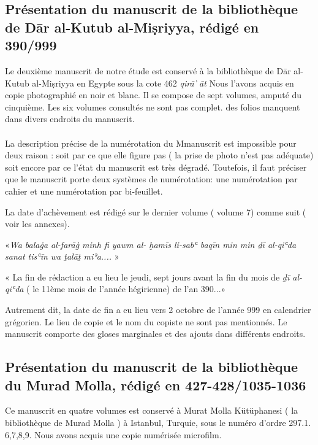 \documentclass[a4paper,12pt]{report}
\begin{document}
\begin{itemize}
\begin{enumerate}
\subsection{	Présentation du manuscrit de la bibliothèque  de Dār al-Kutub al-Miṣriyya, rédigé en 390/999}

Le deuxième manuscrit de notre étude est conservé à la bibliothèque de Dār al-Kutub al-Miṣriyya en Egypte sous la cote 462 
\textit{ qirā ͗ āt  }  Nous l'avons acquis en  copie  photographié en noir et blanc. Il se compose de sept volumes, amputé du cinquième. Les six  volumes consultés ne sont pas complet. des folios manquent  dans divers endroits du manuscrit. 

\paragraph{}
La description précise de la numérotation du Mmanuscrit est impossible pour deux raison : soit par ce que elle figure pas ( la prise de photo n'est pas adéquate)   soit encore par ce  l'état du manuscrit est très dégradé. Toutefois, il faut préciser que le manuscrit porte deux systèmes de numérotation: une numérotation par cahier et une numérotation par bi-feuillet.  

La date d'achèvement est rédigé sur le dernier volume ( volume 7) comme suit ( voir les annexes). 

«\textit{Wa balaġa al-farāġ minh fi yawm al- ḫamīs li-sabʿ baqīn min min ḏī al-qiʿda sanat tisʿīn wa ṯalāṯ miʾa....} »

« La fin de rédaction a eu lieu le jeudi, sept jours avant la fin du mois de \textit{ḏī al-qiʿda} ( le 11ème mois de l'année hégirienne)  de l'an 390...»

Autrement dit, la date de fin a eu lieu vers 2 octobre de l'année 999 en calendrier grégorien. Le lieu de copie et le nom du copiste ne sont pas mentionnés. Le manuscrit comporte des gloses marginales et des ajouts dans différents endroits.


\subsection{ Présentation du manuscrit de la bibliothèque du Murad Molla, rédigé en 427-428/1035-1036 }

Ce manuscrit en quatre volumes est conservé à Murat Molla Kütüphanesi ( la bibliothèque de Murad Molla ) à Istanbul, Turquie, sous le numéro d’ordre 297.1. 6,7,8,9. Nous avons acquis une copie numérisée  microfilm.

\end{enumerate}
\end{itemize}
\end{document}

